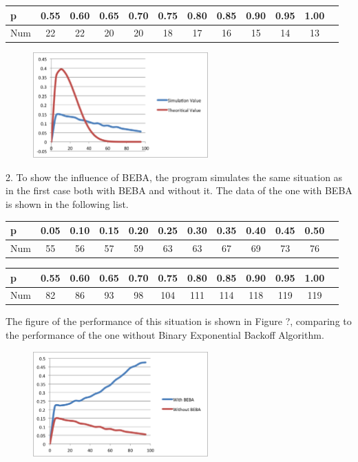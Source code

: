 \documentclass[11pt,a4paper]{report}
\begin{document}
\begin{table}[htbp]
\begin{tabular}{lccccccccccc}
\toprule
p & 0.55 & 0.60 & 0.65  & 0.70 & 0.75 & 0.80 & 0.85 & 0.90 & 0.95 & 1.00 \\
\midrule
Num & 22 & 22 & 20 & 20 & 18 & 17 & 16 & 15 & 14 & 13 \\
\bottomrule
\end{tabular}
\end{table}

\begin{figure}
\centering
\includegraphics[width=0.6\textwidth]{4_2.eps}
\caption{}
\end{figure}

2. To show the influence of BEBA, the program simulates the same situation as in the first case both with BEBA and without it. The data of the one with BEBA is shown in the following list.
\begin{table}[htbp]
\begin{tabular}{lccccccccccc}
\toprule
p & 0.05 & 0.10 & 0.15  & 0.20 & 0.25 & 0.30 & 0.35 & 0.40 & 0.45 & 0.50 \\
\midrule
Num & 55 & 56 & 57 & 59 & 63 & 63 & 67 & 69 & 73 & 76 \\
\bottomrule
\end{tabular}
\end{table}

\begin{table}[htbp]
\begin{tabular}{lccccccccccc}
\toprule
p & 0.55 & 0.60 & 0.65  & 0.70 & 0.75 & 0.80 & 0.85 & 0.90 & 0.95 & 1.00 \\
\midrule
Num & 82 & 86 & 93 & 98 & 104 & 111 & 114 & 118 & 119 & 119 \\
\bottomrule
\end{tabular}
\end{table}

The figure of the performance of this situation is shown in Figure ?, comparing to the performance of the one without Binary Exponential Backoff Algorithm.
\begin{figure}
\centering
\includegraphics[width=0.6\textwidth]{4_3.eps}
\caption{}
\end{figure}
\end{document}
